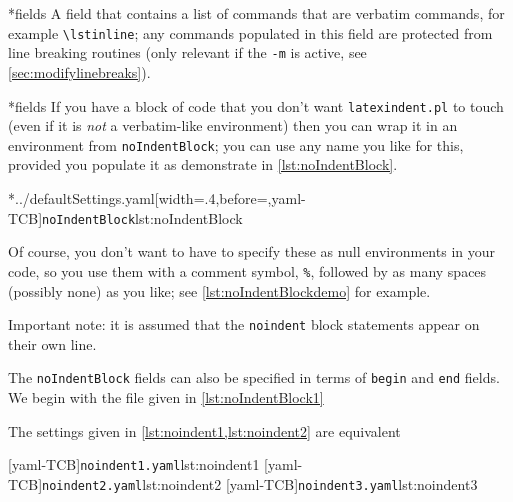 *{fields}
	A field that contains a list of commands that are verbatim commands, for example
	\lstinline|\lstinline|; any commands populated in this field are protected from line
	breaking routines (only relevant if the \texttt{-m} is active, see
	\vref{sec:modifylinebreaks}).

*{fields}
	If you have a block of code that you don't want \texttt{latexindent.pl} to touch (even if
	 it is \emph{not} a verbatim-like environment) then
	you can wrap it in an environment from \texttt{noIndentBlock}; you can use any name you
	like for this, provided you populate it as demonstrate in \cref{lst:noIndentBlock}.

	\cmhlistingsfromfile[style=noIndentBlock]*{../defaultSettings.yaml}[width=.4\linewidth,before=\centering,yaml-TCB]{\texttt{noIndentBlock}}{lst:noIndentBlock}

	Of course, you don't want to have to specify these as null environments in your code, so
	you use them with a comment symbol, \lstinline!%!, followed by as many spaces
	(possibly none) as you like; see \cref{lst:noIndentBlockdemo} for example.


	Important note: it is assumed that the \texttt{noindent} block statements appear on
	their own line.

	The%
	 \texttt{noIndentBlock}
	fields can also be specified in terms of \texttt{begin} and
	\texttt{end} fields. We begin with the file given in \cref{lst:noIndentBlock1}


	The settings given in \cref{lst:noindent1,lst:noindent2} are equivalent

	\begin{cmhtcbraster}[raster columns=3,
			raster left skip=-3.5cm,
			raster right skip=-2cm,
			raster column skip=.03\linewidth]
		[yaml-TCB]{\texttt{noindent1.yaml}}{lst:noindent1}
		[yaml-TCB]{\texttt{noindent2.yaml}}{lst:noindent2}
		[yaml-TCB]{\texttt{noindent3.yaml}}{lst:noindent3}
	\end{cmhtcbraster}

